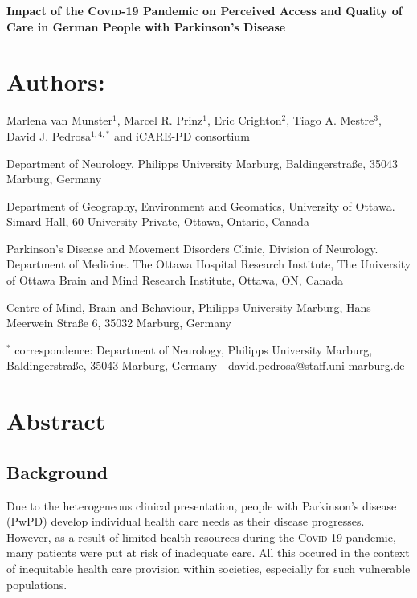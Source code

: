 \documentclass[a4paper,oneside,11pt,english]{scrartcl}
\begin{document}
\begin{titlepage}
\noindent\LARGE{\textbf{Impact of the \textsc{Covid}-19 Pandemic on Perceived Access and Quality of Care in German People with Parkinson's Disease}}
	
\section*{Authors:}
\large{Marlena van Munster$^{1}$, Marcel R. Prinz$^{1}$, Eric Crighton$^{2}$, Tiago A. Mestre$^{3}$, David J. Pedrosa$^{1,4,*}$ and iCARE-PD consortium}\\
	
\begin{compactenum} 
\item \small{Department of Neurology, Philipps University Marburg, Baldingerstraße, 35043 Marburg, Germany}
\item \small{Department of Geography, Environment and Geomatics, University of Ottawa. Simard Hall, 60 University Private,  Ottawa, Ontario, Canada}
\item \small{Parkinson’s Disease and Movement Disorders Clinic, Division of Neurology. Department of Medicine. The Ottawa Hospital Research Institute, The University of Ottawa Brain and Mind Research Institute, Ottawa, ON, Canada}
\item \small{Centre of Mind, Brain and Behaviour, Philipps University Marburg, Hans Meerwein Straße 6, 35032 Marburg, Germany}\\
\end{compactenum}

\noindent\small{$^{*}$ correspondence: Department of Neurology, Philipps University Marburg, Baldingerstraße, 35043 Marburg, Germany - david.pedrosa@staff.uni-marburg.de}
\end{titlepage}


\section*{Abstract}
\subsection*{Background}
Due to the heterogeneous clinical presentation, people with Parkinson's disease (PwPD) develop individual health care needs as their disease progresses. However, as a result of limited health resources during the \textsc{Covid}-19 pandemic, many patients were put at risk of inadequate care. All this occured in the context of inequitable health care provision within societies, especially for such vulnerable populations.
\end{document}
